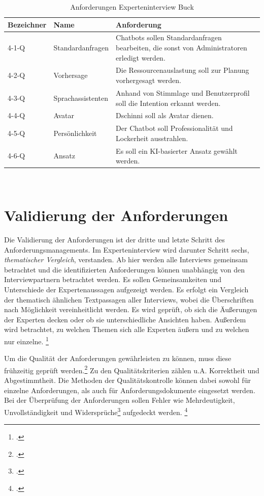 \begin{table}[H]
\centering
\begin{tabularx}{1\textwidth}{l|l|X}
  Bezeichner & Name & Anforderung \\\hline
  4-1-Q & Standardanfragen & Chatbots sollen Standardanfragen bearbeiten, die sonst von Administratoren erledigt werden. \\
  4-2-Q & Vorhersage & Die Ressourcenauslastung soll zur Planung vorhergesagt werden. \\
  4-3-Q & Sprachassistenten & Anhand von Stimmlage und Benutzerprofil soll die Intention erkannt werden. \\
  4-4-Q & Avatar & Dschinni soll als Avatar dienen. \\
  4-5-Q & Persönlichkeit & Der Chatbot soll Professionalität und Lockerheit ausstrahlen. \\
  4-6-Q & Ansatz & Es soll ein KI-basierter Ansatz gewählt werden. \\
\end{tabularx}
\\\eigen
\caption{Anforderungen Experteninterview Buck}
\label{tab:expbuck}
\end{table}


\section{Validierung der Anforderungen} \label{Validierung}
Die Validierung der Anforderungen ist der dritte und letzte Schritt des Anforderungsmanagements. Im Experteninterview wird darunter Schritt sechs, \textit{thematischer Vergleich}, verstanden. Ab hier werden alle Interviews gemeinsam betrachtet und die identifizierten Anforderungen können unabhängig von den Interviewpartnern betrachtet werden. Es sollen Gemeinsamkeiten und Unterschiede der Expertenaussagen aufgezeigt werden.
Es erfolgt ein Vergleich der thematisch ähnlichen Textpassagen aller Interviews, wobei die Überschriften nach Möglichkeit vereinheitlicht werden. Es wird geprüft, ob sich die Äußerungen der Experten decken oder ob sie unterschiedliche Ansichten haben. Außerdem wird betrachtet, zu welchen Themen sich alle Experten äußern und zu welchen nur einzelne.
\footcites[Vgl.][459\psq]{Meuser_1991_Interview}[Vgl.][37]{Matthes_1986}

Um die Qualität der Anforderungen gewährleisten zu können, muss diese frühzeitig geprüft werden.\footcite[Vgl.][4]{Pohl_2015_Requirements}
Zu den Qualitätskriterien zählen u.A. Korrektheit und Abgestimmtheit. Die Methoden der Qualitätskontrolle können dabei sowohl für einzelne Anforderungen, als auch für Anforderungsdokumente eingesetzt werden.
Bei der Überprüfung der Anforderungen sollen Fehler wie \glqq{}Mehrdeutigkeit, Unvollständigkeit und Widersprüche\grqq\footcite[][95]{Pohl_2015_Requirements} aufgedeckt werden.
\footcite[Vgl.][95]{Pohl_2015_Requirements}

